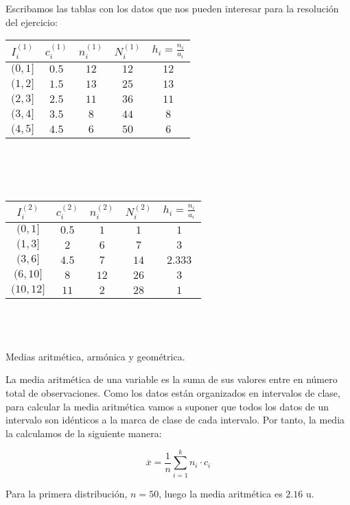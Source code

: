 Escribamos las tablas con los datos que nos pueden interesar para la resolución del ejercicio: \\

\begin{tabular}{| c | c | c | c | c |}
	\hline
	$I_i^{(1)}$ & $c_i^{(1)}$ & $n_i^{(1)}$ & $N_i^{(1)}$ & $h_{i} = \frac{n_{i}}{a_{i}}$ \\ \hline
	$(0, 1]$ & $0.5$ & $12$ & $12$ & $12$ \\
	$(1, 2]$ & $1.5$ & $13$ & $25$ & $13$  \\
	$(2, 3]$ & $2.5$ & $11$ & $36$ & $11$  \\
	$(3, 4]$ & $3.5$ & $8$ & $44$  & $8$   \\
	$(4, 5]$ & $4.5$ & $6$ & $50$  & $6$ \\ \hline
	
\end{tabular} \\\\\\

\begin{tabular}{| c | c | c | c | c |}
	\hline
	$I_i^{(2)}$ & $c_i^{(2)}$ & $n_i^{(2)}$ & $N_i^{(2)} $ & $h_{i} = \frac{n_{i}}{a_{i}}$ \\ \hline
	$(0, 1]$ & $0.5$ & $1$ & $1$ & $1$ \\
	$(1, 3]$ & $2$ & $6$ & $7$ & $3$ \\
	$(3, 6]$ & $4.5$ & $7$ & $14$ & $2.333$ \\
	$(6, 10]$ & $8$ & $12$ & $26$ & $3$ \\
	$(10, 12]$ & $11$ & $2$ & $28$ & $1$ \\ \hline
	
\end{tabular}\\
\\ 
\\
\subproblem
Medias aritm{\'e}tica, arm{\'o}nica y geom{\'e}trica.

La media aritmética de una variable es la suma de sus valores entre en número total de observaciones. Como los datos están organizados en intervalos de clase, para calcular la media aritmética vamos a suponer que todos los datos de un intervalo son idénticos a la marca de clase de cada intervalo. Por tanto, la media la calculamos de la siguiente manera: 
	
	$$\overline{x} = \dfrac{1}{n}\sum_{i=1}^{k}n_i·c_i$$


Para la primera distribución, $n = 50$, luego la media aritmética es $2.16$ u. 

